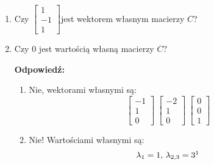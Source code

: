 \documentclass[a4paper,12pt]{article}
\theoremstyle{definition}%
\theoremstyle{definition}
\theoremstyle{problem}
\begin{document}
\begin{enumerate}[label=\alph*)]
\begin{enumerate}[label=\Roman*:]
\end{enumerate}
\item Czy $\begin{bmatrix}
1\\-1\\1
\end{bmatrix}$jest wektorem własnym macierzy $C$?
\item Czy $0$ jest wartością własną macierzy $C$?

\textbf{Odpowiedź:}
\begin{enumerate}[label=\alph*)]
\item Nie, wektorami własnymi są:
$$\begin{bmatrix}
-1\\1\\0
\end{bmatrix}\ \begin{bmatrix}
-2\\1\\0
\end{bmatrix}\ \begin{bmatrix}
0\\0\\1
\end{bmatrix}$$
\item Nie! Wartościami własnymi są:
$$\lambda _1 = 1,\, \lambda _{2,3}=3\footnotemark$$
\end{enumerate}
\end{enumerate}
\end{document}
